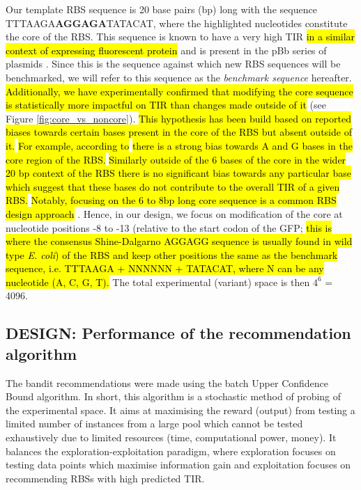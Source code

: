 \documentclass{article}
\begin{document}
Our template RBS sequence is 20 base pairs (bp) long with the sequence TTTAAGA\textbf{AGGAGA}TATACAT, where the highlighted nucleotides constitute the core of the RBS.
This sequence is known to have a very high TIR \hl{in a similar context of expressing fluorescent protein} and is present in the pBb series of plasmids \cite{Lee2011}.
Since this is the sequence against which new RBS sequences will be benchmarked,
we will refer to this sequence as the \textit{benchmark sequence} hereafter.
\hl{Additionally, we have experimentally confirmed that modifying the core sequence is statistically more impactful on TIR than changes made outside of it }(see Figure \ref{fig:core_vs_noncore}).
\hl{This hypothesis has been build based on reported biases towards certain bases present in the core of the RBS but absent outside of it.}
\hl{For example, according to} \cite{SHULTZABERGER2001} \hl{there is a strong bias towards A and G bases in the core region of the RBS.}
\hl{Similarly outside of the 6 bases of the core in the wider 20 bp context of the RBS there is no significant bias towards any particular base which suggest that these bases do not contribute to the overall TIR of a given RBS.} 
\hl{Notably, focusing on the 6 to 8bp long core sequence is a common RBS design approach} \cite{Jeschek2016}.
Hence, in our design, we focus on modification of the core at nucleotide positions -8 to -13 (relative to the start codon of the GFP; \hl{ this is where the consensus Shine-Dalgarno AGGAGG sequence is usually found in wild type \textit{E. coli}) of the RBS and keep other positions the same as the benchmark sequence, i.e. TTTAAGA + NNNNNN + TATACAT, where N can be any nucleotide (A, C, G, T).} 
The total experimental (variant) space is then $4^6$ = 4096.

\subsection{DESIGN: Performance of the recommendation algorithm}
\label{sec:ucb-results}

The bandit recommendations were made using the batch Upper Confidence Bound algorithm.
In short, this algorithm is a stochastic method of probing of the experimental space. 
It aims at maximising the reward (output) from testing a limited number of instances from a large pool which cannot be tested exhaustively due to limited resources (time, computational power, money).
It balances the exploration-exploitation paradigm, where exploration focuses on testing data points which maximise information gain and exploitation focuses on recommending RBSs with high predicted TIR.\\
\end{document}
